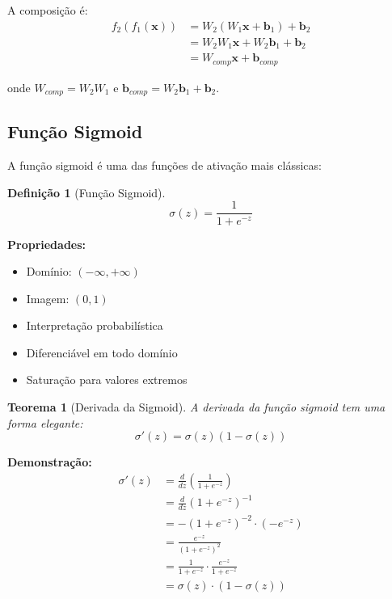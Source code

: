 \documentclass[a4paper,12pt]{article}
\newtheorem{definicao}{Definição}[section]
\newtheorem{teorema}{Teorema}[section]
\begin{document}
A composição é:
\begin{align}
    f_2(f_1(\mathbf{x})) &= W_2(W_1\mathbf{x} + \mathbf{b}_1) + \mathbf{b}_2 \\
    &= W_2W_1\mathbf{x} + W_2\mathbf{b}_1 + \mathbf{b}_2 \\
    &= W_{comp}\mathbf{x} + \mathbf{b}_{comp}
\end{align}

onde $W_{comp} = W_2W_1$ e $\mathbf{b}_{comp} = W_2\mathbf{b}_1 + \mathbf{b}_2$.

\subsection{Função Sigmoid}

A função sigmoid é uma das funções de ativação mais clássicas:

\begin{definicao}[Função Sigmoid]
\begin{equation}
    \sigma(z) = \frac{1}{1 + e^{-z}}
\end{equation}
\end{definicao}

\textbf{Propriedades:}
\begin{itemize}
    \item Domínio: $(-\infty, +\infty)$
    \item Imagem: $(0, 1)$
    \item Interpretação probabilística
    \item Diferenciável em todo domínio
    \item Saturação para valores extremos
\end{itemize}

\begin{teorema}[Derivada da Sigmoid]
A derivada da função sigmoid tem uma forma elegante:
\begin{equation}
    \sigma'(z) = \sigma(z)(1 - \sigma(z))
    \label{eq:sigmoid_derivative}
\end{equation}
\end{teorema}

\textbf{Demonstração:}
\begin{align}
    \sigma'(z) &= \frac{d}{dz}\left(\frac{1}{1 + e^{-z}}\right) \\
    &= \frac{d}{dz}(1 + e^{-z})^{-1} \\
    &= -(1 + e^{-z})^{-2} \cdot (-e^{-z}) \\
    &= \frac{e^{-z}}{(1 + e^{-z})^2} \\
    &= \frac{1}{1 + e^{-z}} \cdot \frac{e^{-z}}{1 + e^{-z}} \\
    &= \sigma(z) \cdot (1 - \sigma(z))
\end{align}
\end{document}
